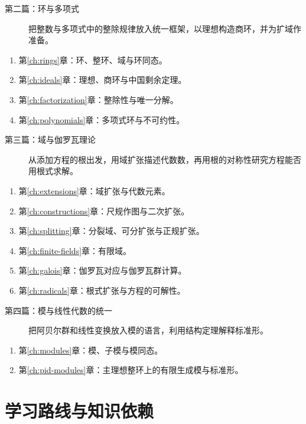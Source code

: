 \documentclass[UTF8,12pt,a4paper,fontset=fandol]{ctexbook}
\begin{document}
\begin{description}
  \item[第二篇：环与多项式] 把整数与多项式中的整除规律放入统一框架，以理想构造商环，并为扩域作准备。
\end{description}
\begin{enumerate}[resume]
  \item 第\ref{ch:rings}章：环、整环、域与环同态。
  \item 第\ref{ch:ideals}章：理想、商环与中国剩余定理。
  \item 第\ref{ch:factorization}章：整除性与唯一分解。
  \item 第\ref{ch:polynomials}章：多项式环与不可约性。
\end{enumerate}

\begin{description}
  \item[第三篇：域与伽罗瓦理论] 从添加方程的根出发，用域扩张描述代数数，再用根的对称性研究方程能否用根式求解。
\end{description}
\begin{enumerate}[resume]
  \item 第\ref{ch:extensions}章：域扩张与代数元素。
  \item 第\ref{ch:constructions}章：尺规作图与二次扩张。
  \item 第\ref{ch:splitting}章：分裂域、可分扩张与正规扩张。
  \item 第\ref{ch:finite-fields}章：有限域。
  \item 第\ref{ch:galois}章：伽罗瓦对应与伽罗瓦群计算。
  \item 第\ref{ch:radicals}章：根式扩张与方程的可解性。
\end{enumerate}

\begin{description}
  \item[第四篇：模与线性代数的统一] 把阿贝尔群和线性变换放入模的语言，利用结构定理解释标准形。
\end{description}
\begin{enumerate}[resume]
  \item 第\ref{ch:modules}章：模、子模与模同态。
  \item 第\ref{ch:pid-modules}章：主理想整环上的有限生成模与标准形。
\end{enumerate}

\section{学习路线与知识依赖}
\end{document}
